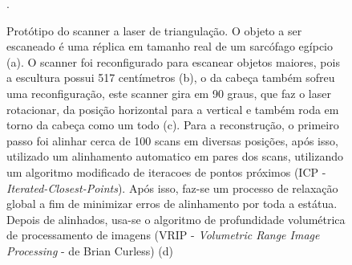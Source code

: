 \begin{figure}[!h]

\centering

\caption{%
   Protótipo do scanner a laser de triangulação. O objeto a ser escaneado é uma réplica em tamanho real
   de um sarcófago egípcio (a). O scanner foi reconfigurado para escanear objetos maiores, pois 
   a escultura possui 517 centímetros (b), o da cabeça também sofreu uma reconfiguração, este scanner gira em 90 graus, 
   que faz o laser rotacionar, da posição horizontal para a vertical e também roda em torno da cabeça como um todo (c).
   Para a reconstrução, o primeiro passo foi alinhar cerca de 100 scans em
   diversas posições, após isso, utilizado um 
   alinhamento automatico em pares dos scans, utilizando um algoritmo modificado de iteracoes de pontos próximos 
   (ICP - \emph {Iterated-Closest-Points}). Após isso, faz-se um processo de relaxação global a fim de minimizar erros 
   de alinhamento por toda a estátua. Depois de alinhados, usa-se o algoritmo de profundidade volumétrica de 
   processamento de imagens (VRIP - \emph {Volumetric Range Image Processing} -
   de Brian Curless) (d)~\cite{levoy2000digital}}.
  \label{fig:david}
\end{figure}

